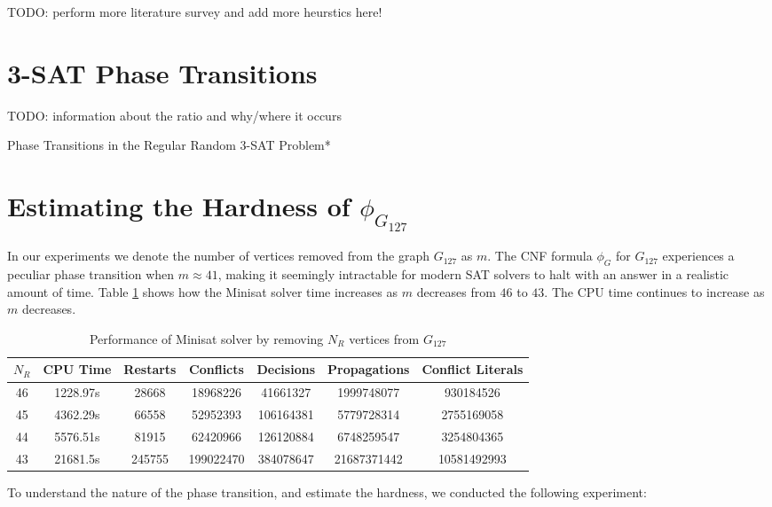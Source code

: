 \documentclass[paper=a4, fontsize=11pt]{scrartcl} %
\newcommand{\TODO}{{\color{red}TODO}}
\begin{document}
\TODO: perform more literature survey and add more heurstics here!


\section{3-SAT Phase Transitions}
\TODO: information about the ratio and why/where it occurs

Phase Transitions in the Regular Random 3-SAT Problem*

\section{Estimating the Hardness of $\phi_{G_{127}}$}
In our experiments we denote the number of vertices removed from the graph $G_{127}$ as $m$.
The CNF formula $\phi_G$ for $G_{127}$ experiences a peculiar phase transition when $m \approx 41$,
making it seemingly intractable for modern SAT solvers to halt with an answer in a realistic 
amount of time. Table \ref{tab:performanceSat} shows how the Minisat solver time increases 
as $m$ decreases from $46$ to $43$. The CPU time continues to increase as $m$ decreases.

\begin{table}
	\caption{Performance of Minisat solver by removing $N_R$ vertices from $G_{127}$}
	\begin{tabular}{c | c | c | c | c | c | c}
		\hline
		$N_R$ & CPU Time & Restarts & Conflicts & Decisions & Propagations & Conflict Literals \\ \hline
		46 & 1228.97s & 28668 & 18968226 & 41661327 & 1999748077 & 930184526 \\ 
		45 & 4362.29s & 66558 & 52952393 & 106164381 & 5779728314 & 2755169058 \\ 
		44 & 5576.51s & 81915 & 62420966 & 126120884 & 6748259547 & 3254804365 \\ 
		43 & 21681.5s & 245755 & 199022470 & 384078647 & 21687371442 & 10581492993 \\ 
		\hline
	\end{tabular}
	\label{tab:performanceSat}
\end{table}

To understand the nature of the phase transition, and estimate the hardness, we conducted 
the following experiment:
\end{document}
